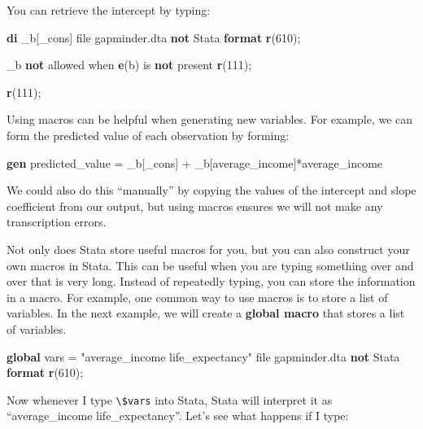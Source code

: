 \documentclass[
]{book}
\newenvironment{Shaded}{\begin{snugshade}}{\end{snugshade}}
\newcommand{\DataTypeTok}[1]{\textcolor[rgb]{0.13,0.29,0.53}{#1}}
\newcommand{\FunctionTok}[1]{\textcolor[rgb]{0.13,0.29,0.53}{\textbf{#1}}}
\newcommand{\KeywordTok}[1]{\textcolor[rgb]{0.13,0.29,0.53}{\textbf{#1}}}
\newcommand{\NormalTok}[1]{#1}
\newcommand{\StringTok}[1]{\textcolor[rgb]{0.31,0.60,0.02}{#1}}
\begin{document}
You can retrieve the intercept by typing:

\begin{Shaded}
\begin{Highlighting}[]
\KeywordTok{di}\NormalTok{ \_b[}\DataTypeTok{\_cons}\NormalTok{]}
\NormalTok{file gapminder.dta }\KeywordTok{not}\NormalTok{ Stata }\KeywordTok{format}
\FunctionTok{r}\NormalTok{(610);}


\NormalTok{\_b }\KeywordTok{not}\NormalTok{ allowed when }\FunctionTok{e}\NormalTok{(b) is }\KeywordTok{not}\NormalTok{ present}
\FunctionTok{r}\NormalTok{(111);}

\FunctionTok{r}\NormalTok{(111);}
\end{Highlighting}
\end{Shaded}

Using macros can be helpful when generating new variables. For example, we can form the predicted value of each observation by forming:

\begin{Shaded}
\begin{Highlighting}[]
\KeywordTok{gen}\NormalTok{ predicted\_value = \_b[}\DataTypeTok{\_cons}\NormalTok{] + \_b[average\_income]*average\_income }
\end{Highlighting}
\end{Shaded}

We could also do this ``manually'' by copying the values of the intercept and slope coefficient from our output, but using macros ensures we will not make any transcription errors.

Not only does Stata store useful macros for you, but you can also construct your own macros in Stata. This can be useful when you are typing something over and over that is very long. Instead of repeatedly typing, you can store the information in a macro. For example, one common way to use macros is to store a list of variables. In the next example, we will create a \textbf{global macro} that stores a list of variables.

\begin{Shaded}
\begin{Highlighting}[]
\KeywordTok{global}\NormalTok{ vars = }\StringTok{"average\_income life\_expectancy"}
\NormalTok{file gapminder.dta }\KeywordTok{not}\NormalTok{ Stata }\KeywordTok{format}
\FunctionTok{r}\NormalTok{(610);}
\end{Highlighting}
\end{Shaded}

Now whenever I type \texttt{\textbackslash{}\$vars} into Stata, Stata will interpret it as ``average\_income life\_expectancy''. Let's see what happens if I type:
\end{document}
